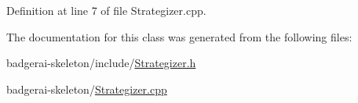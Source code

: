 Definition at line 7 of file Strategizer.\-cpp.


\begin{DoxyCode}
{
}
\end{DoxyCode}


The documentation for this class was generated from the following files\-:\begin{DoxyCompactItemize}
\item 
badgerai-\/skeleton/include/\hyperlink{Strategizer_8h}{Strategizer.\-h}\item 
badgerai-\/skeleton/\hyperlink{Strategizer_8cpp}{Strategizer.\-cpp}\end{DoxyCompactItemize}
